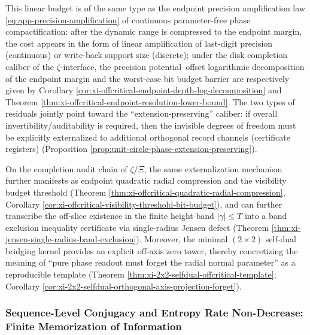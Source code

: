 This linear budget is of the same type as the endpoint precision amplification law \eqref{eq:app-precision-amplification} of continuous parameter-free phase compactification: after the dynamic range is compressed to the endpoint margin, the cost appears in the form of linear amplification of last-digit precision (continuous) or write-back support size (discrete); under the disk completion caliber of the \(\zeta\)-interface, the precision potential--offset logarithmic decomposition of the endpoint margin and the worst-case bit budget barrier are respectively given by Corollary \ref{cor:xi-offcritical-endpoint-depth-log-decomposition} and Theorem \ref{thm:xi-offcritical-endpoint-resolution-lower-bound}. The two types of residuals jointly point toward the ``extension-preserving'' caliber: if overall invertibility/auditability is required, then the invisible degrees of freedom must be explicitly externalized to additional orthogonal record channels (certificate registers) (Proposition \ref{prop:unit-circle-phase-extension-preserving}).
\par
On the completion audit chain of \(\zeta/\Xi\), the same externalization mechanism further manifests as endpoint quadratic radial compression and the visibility budget threshold (Theorem \ref{thm:xi-offcritical-quadratic-radial-compression}, Corollary \ref{cor:xi-offcritical-visibility-threshold-bit-budget}), and can further transcribe the off-slice existence in the finite height band \(|\gamma|\le T\) into a band exclusion inequality certificate via single-radius Jensen defect (Theorem \ref{thm:xi-jensen-single-radius-band-exclusion}).
Moreover, the minimal \((2\times2)\) self-dual bridging kernel provides an explicit off-axis zero tower, thereby concretizing the meaning of ``pure phase readout must forget the radial normal parameter'' as a reproducible template (Theorem \ref{thm:xi-2x2-selfdual-offcritical-template}; Corollary \ref{cor:xi-2x2-selfdual-orthogonal-axis-projection-forget}).











\subsubsection{Sequence-Level Conjugacy and Entropy Rate Non-Decrease: Finite Memorization of Information}\label{subsubsec:insight-entropy-memory}
